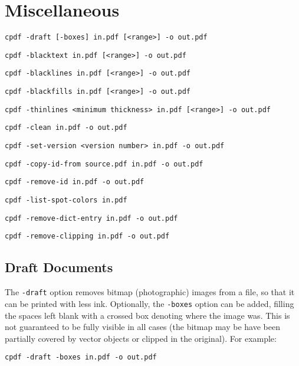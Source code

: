 \documentclass{book}
\begin{document}
\chapter{Miscellaneous}
  {\small\begin{framed}
  \noindent\verb!cpdf -draft [-boxes] in.pdf [<range>] -o out.pdf!

  \vspace{1.5mm}
  \noindent\verb!cpdf -blacktext in.pdf [<range>] -o out.pdf!

  \vspace{1.5mm}
  \noindent\verb!cpdf -blacklines in.pdf [<range>] -o out.pdf!

  \vspace{1.5mm}
  \noindent\verb!cpdf -blackfills in.pdf [<range>] -o out.pdf!

  \vspace{1.5mm}
  \noindent\verb!cpdf -thinlines <minimum thickness> in.pdf [<range>] -o out.pdf!

  \vspace{1.5mm}
  \noindent\verb!cpdf -clean in.pdf -o out.pdf!

  \vspace{1.5mm}
  \noindent\verb!cpdf -set-version <version number> in.pdf -o out.pdf!

  \vspace{1.5mm}
  \noindent\verb!cpdf -copy-id-from source.pdf in.pdf -o out.pdf!

  \vspace{1.5mm}
  \noindent\verb!cpdf -remove-id in.pdf -o out.pdf!

  \vspace{1.5mm}
  \noindent\verb!cpdf -list-spot-colors in.pdf!

  \vspace{1.5mm}
  \noindent\verb!cpdf -remove-dict-entry in.pdf -o out.pdf!

  \vspace{1.5mm}
  \noindent\verb!cpdf -remove-clipping in.pdf -o out.pdf!
  \end{framed}}
  \section{Draft Documents}
    The \texttt{-draft} option removes bitmap (photographic) images from a
file, so that it can be printed with less ink. Optionally, the
\texttt{-boxes} option can be added, filling the spaces left blank with a
crossed box denoting where the image was. This is not guaranteed to be fully
visible in all cases (the bitmap may be have been partially covered by vector
objects or clipped in the original). For example:
  \begin{framed}
    \small\verb!cpdf -draft -boxes in.pdf -o out.pdf!
  \end{framed}
\end{document}
